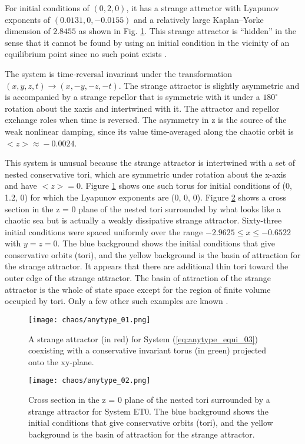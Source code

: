 For initial conditions of $(0, 2, 0)$, it has a strange attractor with Lyapunov exponents of
$(0.0131, 0, −0.0155)$ and a relatively large Kaplan–Yorke dimension of $2.8455$ as shown
in Fig. \ref{fig:anytype_01}. This strange attractor is ``hidden'' in the sense that
it cannot be found by using an initial condition in the vicinity of an equilibrium point
since no such point exists \cite{Leonov2011Localization,leonov2013hidden}.

The system is time-reversal invariant under the transformation $(x, y, z, t)\rightarrow(x, −y, −z, −t)$.
The strange attractor is slightly asymmetric and is accompanied
by a strange repellor that is symmetric with it under a $180^{\circ}$ rotation about the xaxis
and intertwined with it. The attractor and repellor exchange roles when time is
reversed. The asymmetry in z is the source of the weak nonlinear damping, since its
value time-averaged along the chaotic orbit is $<z>\approx{}−0.0024$.

This system is unusual because the strange attractor is intertwined with a set of
nested conservative tori, which are symmetric under rotation about the x-axis and
have $<z> = 0$. Figure \ref{fig:anytype_01} shows one such torus for initial conditions of (0, 1.2, 0) for which
the Lyapunov exponents are (0, 0, 0). Figure \ref{fig:anytype_02} shows a cross section in the z = 0 plane
of the nested tori surrounded by what looks like a chaotic sea but is actually a weakly
dissipative strange attractor. Sixty-three initial conditions were spaced uniformly over
the range $−2.9625 \leq x \leq −0.6522$ with $y = z = 0$. The blue background shows the
initial conditions that give conservative orbits (tori), and the yellow background is
the basin of attraction for the strange attractor. It appears that there are additional
thin tori toward the outer edge of the strange attractor. The basin of attraction of
the strange attractor is the whole of state space except for the region of finite volume
occupied by tori. Only a few other such examples are known \cite{sprott2014heat,politi1986coexistence,sprott2014dynamical}.

\begin{figure}[htbp]
\centering
\texttt{[image: chaos/anytype\_01.png]}
\caption{\label{fig:anytype_01}
A strange attractor (in red) for System (\ref{eq:anytype_equi_03}) coexisting with a conservative invariant
torus (in green) projected onto the xy-plane.}
\end{figure}

\begin{figure}[htbp]
\centering
\texttt{[image: chaos/anytype\_02.png]}
\caption{\label{fig:anytype_02}
Cross section in the z = 0 plane of the nested tori surrounded by a strange attractor
for System ET0. The blue background shows the initial conditions that give conservative
orbits (tori), and the yellow background is the basin of attraction for the strange attractor.}
\end{figure}

